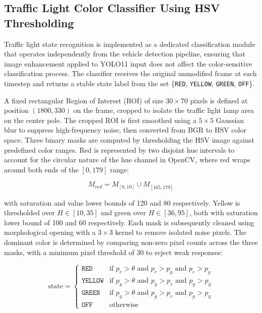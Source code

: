 \subsection{Traffic Light Color Classifier Using HSV Thresholding}

Traffic light state recognition is implemented as a dedicated classification module that operates independently from the vehicle detection pipeline, ensuring that image enhancement applied to YOLO11 input does not affect the color-sensitive classification process. The classifier receives the original unmodified frame at each timestep and returns a stable state label from the set \{\texttt{RED}, \texttt{YELLOW}, \texttt{GREEN}, \texttt{OFF}\}.

A fixed rectangular Region of Interest (ROI) of size $30 \times 70$ pixels is defined at position $(1800, 330)$ on the frame, cropped to isolate the traffic light lamp area on the center pole. The cropped ROI is first smoothed using a $5 \times 5$ Gaussian blur to suppress high-frequency noise, then converted from BGR to HSV color space. Three binary masks are computed by thresholding the HSV image against predefined color ranges. Red is represented by two disjoint hue intervals to account for the circular nature of the hue channel in OpenCV, where red wraps around both ends of the $[0, 179]$ range:

\begin{equation}
M_{red} = M_{[0,10]} \cup M_{[165,179]}
\end{equation}

\noindent with saturation and value lower bounds of 120 and 80 respectively. Yellow is thresholded over $H \in [10, 35]$ and green over $H \in [36, 95]$, both with saturation lower bound of 100 and 60 respectively. Each mask is subsequently cleaned using morphological opening with a $3 \times 3$ kernel to remove isolated noise pixels. The dominant color is determined by comparing non-zero pixel counts across the three masks, with a minimum pixel threshold of 30 to reject weak responses:

\begin{equation}
\text{state} =
\begin{cases}
\texttt{RED}    & \text{if } p_r > \theta \text{ and } p_r > p_y \text{ and } p_r > p_g \\
\texttt{YELLOW} & \text{if } p_y > \theta \text{ and } p_y > p_r \text{ and } p_y > p_g \\
\texttt{GREEN}  & \text{if } p_g > \theta \text{ and } p_g > p_r \text{ and } p_g > p_y \\
\texttt{OFF}    & \text{otherwise}
\end{cases}
\end{equation}

